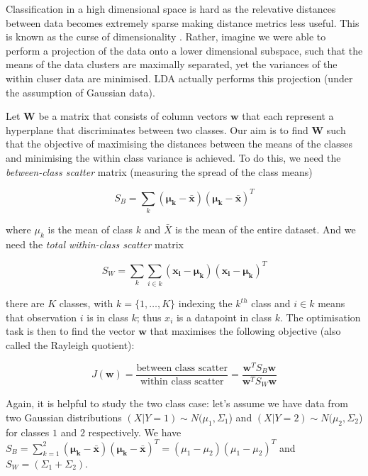 \documentclass{article}
\begin{document}
Classification in a high dimensional space is hard as the relevative distances between data becomes extremely sparse making distance metrics less useful. This is known as the curse of dimensionality \cite{parsons2004subspace}. Rather, imagine we were able to perform a projection of the data onto a lower dimensional subspace, such that the means of the data clusters are maximally separated, yet the variances of the within cluser data are minimised. LDA actually performs this projection (under the assumption of Gaussian data).

Let $\mathbf{W}$ be a matrix that consists of column vectors $\mathbf{w}$ that each represent a hyperplane that discriminates between two classes. Our aim is to find $\mathbf{W}$ such that the objective of maximising the distances between the means of the classes and minimising the within class variance is achieved. To do this, we need the \textit{between-class scatter} matrix (measuring the spread of the class means)

$$S_B = \sum_k(\mathbf{\mu_k - \mathbf{\bar{x}}})(\mathbf{\mu_k - \mathbf{\bar{x}}})^T$$

where $\mu_k$ is the mean of class $k$ and $\bar{X}$ is the mean of the entire dataset. And we need the \textit{total within-class scatter} matrix

$$S_W = \sum_k \sum_{i \in k}(\mathbf{x_i} - \mathbf{\mu_k})(\mathbf{x_i} - \mathbf{\mu_k})^T$$

there are $K$ classes, with $k = \{1, \dots, K\}$ indexing the $k^{th}$ class and $i \in k$ means that observation $i$ is in class $k$; thus $x_i$ is a datapoint in class $k$. The optimisation task is then to find the vector $\mathbf{w}$ that maximises the following objective (also called the Rayleigh quotient):

$$
J(\mathbf{w}) = \frac{\textrm{between class scatter}}{\textrm{within class scatter}} = \frac{\mathbf{w}^TS_B\mathbf{w}}{\mathbf{w}^TS_W\mathbf{w}}
$$

Again, it is helpful to study the two class case: let's assume we have data from two Gaussian distributions $(X|Y=1) \sim N(\mu_1, \Sigma_1$) and $(X|Y=2) \sim N(\mu_2, \Sigma_2$) for classes $1$ and $2$ respectively. We have $S_B = \sum\limits_{k=1}^2(\mathbf{\mu_k - \mathbf{\bar{x}}})(\mathbf{\mu_k - \mathbf{\bar{x}}})^T = (\mu_1 - \mu_2)(\mu_1 - \mu_2)^T$ and $S_W = (\Sigma_1 + \Sigma_2)$.
\end{document}
